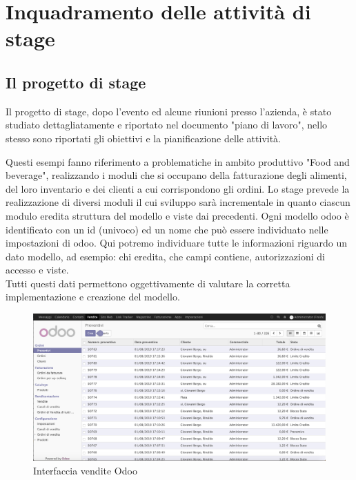 
\hypertarget{(chap:capitolo3)}{}
\chapter{Inquadramento delle attività di stage}
\section{Il progetto di stage}

Il progetto di stage, dopo l'evento  ed alcune riunioni presso l'azienda, è stato studiato dettagliatamente e riportato nel documento "piano di lavoro", nello stesso sono riportati gli obiettivi e la pianificazione delle attività.

Questi esempi fanno riferimento a problematiche in ambito produttivo "Food and beverage", realizzando i moduli che si occupano della fatturazione degli alimenti, del loro inventario e dei clienti a cui corrispondono gli ordini. 
 Lo stage prevede la realizzazione di diversi moduli il cui sviluppo sarà incrementale in quanto ciascun modulo eredita struttura del modello e viste dai precedenti.
\newpage
Ogni modello odoo è identificato con un id (univoco) ed un nome che può essere individuato nelle impostazioni di odoo. Qui potremo individuare tutte le informazioni riguardo un dato modello, ad esempio: chi eredita, che campi contiene, autorizzazioni di accesso e viste. \\
Tutti questi dati permettono oggettivamente di valutare la corretta implementazione e creazione del modello.

\begin{figure}[H]
	\begin{center} \includegraphics[scale=0.35]{figures/saleorder}
		\caption[Interfacciao vendite]{Interfaccia vendite Odoo}
		\label{fig:sale_order}
	\end{center}
\end{figure}

